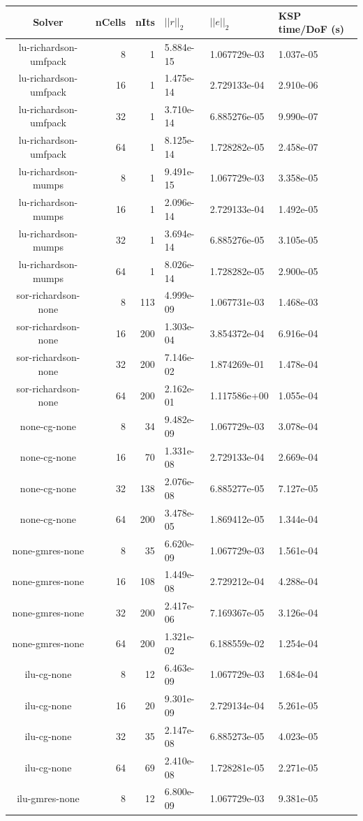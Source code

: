 \documentclass{article}\usepackage[T1]{fontenc}
\begin{document}
\begin{tabular}{crrlll}
\hline
Solver&nCells&nIts&$||r||_2$&$||e||_2$&KSP time/DoF (s)\\
\hline
lu-richardson-umfpack&8&1&5.884e-15&1.067729e-03&1.037e-05\\
lu-richardson-umfpack&16&1&1.475e-14&2.729133e-04&2.910e-06\\
lu-richardson-umfpack&32&1&3.710e-14&6.885276e-05&9.990e-07\\
lu-richardson-umfpack&64&1&8.125e-14&1.728282e-05&2.458e-07\\ \hline
lu-richardson-mumps&8&1&9.491e-15&1.067729e-03&3.358e-05\\
lu-richardson-mumps&16&1&2.096e-14&2.729133e-04&1.492e-05\\
lu-richardson-mumps&32&1&3.694e-14&6.885276e-05&3.105e-05\\
lu-richardson-mumps&64&1&8.026e-14&1.728282e-05&2.900e-05\\ \hline
sor-richardson-none&8&113&4.999e-09&1.067731e-03&1.468e-03\\
sor-richardson-none&16&200&1.303e-04&3.854372e-04&6.916e-04\\
sor-richardson-none&32&200&7.146e-02&1.874269e-01&1.478e-04\\
sor-richardson-none&64&200&2.162e-01&1.117586e+00&1.055e-04\\ \hline
none-cg-none&8&34&9.482e-09&1.067729e-03&3.078e-04\\
none-cg-none&16&70&1.331e-08&2.729133e-04&2.669e-04\\
none-cg-none&32&138&2.076e-08&6.885277e-05&7.127e-05\\
none-cg-none&64&200&3.478e-05&1.869412e-05&1.344e-04\\ \hline
none-gmres-none&8&35&6.620e-09&1.067729e-03&1.561e-04\\
none-gmres-none&16&108&1.449e-08&2.729212e-04&4.288e-04\\
none-gmres-none&32&200&2.417e-06&7.169367e-05&3.126e-04\\
none-gmres-none&64&200&1.321e-02&6.188559e-02&1.254e-04\\ \hline
ilu-cg-none&8&12&6.463e-09&1.067729e-03&1.684e-04\\
ilu-cg-none&16&20&9.301e-09&2.729134e-04&5.261e-05\\
ilu-cg-none&32&35&2.147e-08&6.885273e-05&4.023e-05\\
ilu-cg-none&64&69&2.410e-08&1.728281e-05&2.271e-05\\ \hline
ilu-gmres-none&8&12&6.800e-09&1.067729e-03&9.381e-05\\

\end{tabular}
\end{document}
